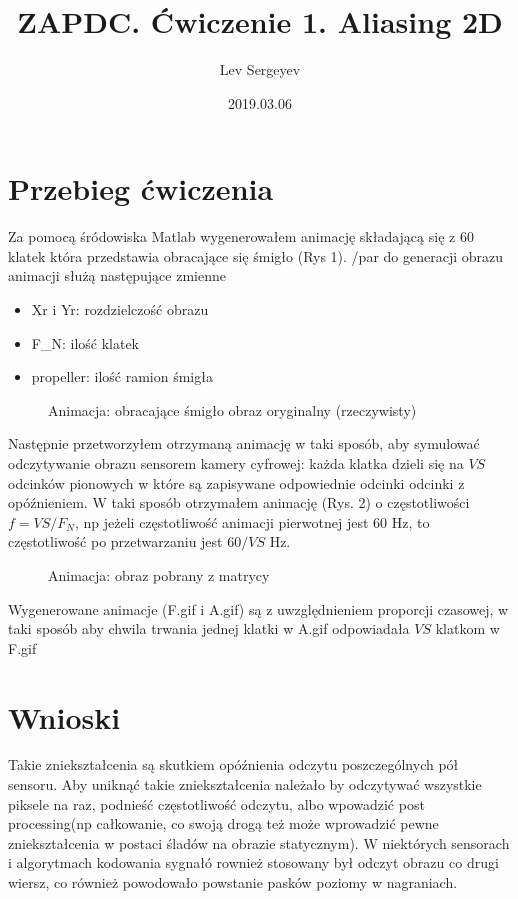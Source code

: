 \documentclass{article}
\author{Lev Sergeyev}
\title{ZAPDC. Ćwiczenie 1. Aliasing 2D}
\date{2019.03.06}
\begin{document}
\maketitle


\section{Przebieg ćwiczenia}
Za pomocą śródowiska Matlab wygenerowałem animację składającą się z 60 klatek która przedstawia obracające się śmigło (Rys 1).
/par do generacji obrazu animacji służą następujące zmienne
\begin{itemize}  
		\item Xr i Yr: rozdzielczość obrazu
		\item F\_N: ilość klatek
		\item propeller: ilość ramion śmigła
\end{itemize}

\begin{figure}[h]
\centering
{}
\caption{Animacja: obracające śmigło obraz oryginalny (rzeczywisty)}
\end{figure}

Następnie przetworzyłem otrzymaną animację w taki sposób, aby symulować odczytywanie obrazu sensorem kamery cyfrowej: każda klatka dzieli się na \( VS \) odcinków pionowych w które są zapisywane odpowiednie odcinki odcinki z opóźnieniem. W taki sposób otrzymałem animację (Rys. 2) o częstotliwości \(f = VS / F_N \), np jeżeli częstotliwość animacji pierwotnej jest \(60 \) Hz, to częstotliwość po przetwarzaniu jest \(60 / VS \) Hz.

\begin{figure}[h]
\centering
{}
\caption{Animacja: obraz pobrany z matrycy}
\end{figure}

Wygenerowane animacje (F.gif i A.gif) są z uwzględnieniem proporcji czasowej, w taki sposób aby chwila trwania jednej klatki w A.gif odpowiadała \( VS \) klatkom w F.gif

\section{Wnioski}
\par
Takie zniekształcenia są skutkiem opóźnienia odczytu poszczególnych pół sensoru. Aby uniknąć takie zniekształcenia należało by odczytywać wszystkie piksele na raz, podnieść częstotliwość odczytu, albo wpowadzić post processing(np całkowanie, co swoją drogą też może wprowadzić pewne zniekształcenia w postaci śladów na obrazie statycznym). W niektórych sensorach i algorytmach kodowania sygnałó rownież stosowany był odczyt obrazu co drugi wiersz, co również powodowało powstanie pasków poziomy w nagraniach.
\end{document}
